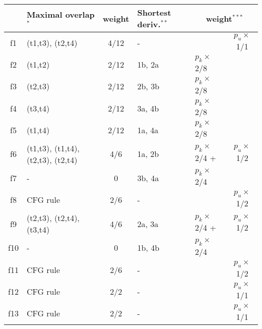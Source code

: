 \begin{tabular}{c|p{}c|p{}l c}
&Maximal overlap$^*$&weight&Shortest deriv.$^{**}$&\multicolumn{2}{c}{weight$^{***}$}\\\hline
f1&(t1,t3), (t2,t4)	&4/12		&- 		&				&$p_u\times$	1/1\\     %
f2&(t1,t2)		&2/12		&1b, 2a 	&$p_k\times$	2/8	&\\	 
f3&(t2,t3)		&2/12		&2b, 3b 	&$p_k\times$	2/8	&\\
f4&(t3,t4)		&2/12		&3a, 4b 	&$p_k\times$	2/8	&\\
f5&(t1,t4)		&2/12		&1a, 4a 	&$p_k\times$	2/8	&\\
f6&(t1,t3), (t1,t4), 
(t2,t3), (t2,t4)	&4/6		&1a, 2b 	&$p_k\times$	2/4	+& $p_u\times$	1/2\\	%
f7&- 			&0		&3b, 4a 	&$p_k\times$	2/4	&\\
f8&CFG rule		&2/6		&- 		&				&$p_u\times$	1/2\\	%
f9&(t2,t3), (t2,t4), 
(t3,t4)		&4/6		&2a, 3a 	&$p_k\times$	2/4	+&$p_u\times$	1/2\\	%
f10&- 			&0		&1b, 4b 	&$p_k\times$	2/4	&\\
f11&CFG rule	&2/6		&- 		&				&$p_u\times$1/2\\	%
f12&CFG rule	&2/2		&- 		&				&$p_u\times$1/1\\	%
f13&CFG rule	&2/2		&- 		&				&$p_u\times$1/1\\	%
\end{tabular}
